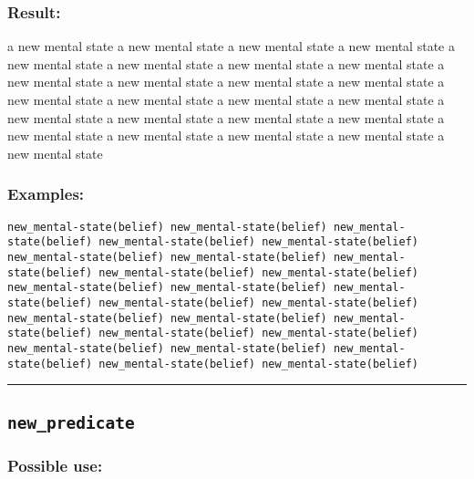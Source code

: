 \documentclass[]{book}
\theoremstyle{definition}
\theoremstyle{definition}
\theoremstyle{definition}
\theoremstyle{remark}
\begin{document}
\subsubsection{Result:}\label{result-358}

a new mental state a new mental state a new mental state a new mental
state a new mental state a new mental state a new mental state a new
mental state a new mental state a new mental state a new mental state a
new mental state a new mental state a new mental state a new mental
state a new mental state a new mental state a new mental state a new
mental state a new mental state a new mental state a new mental state a
new mental state a new mental state a new mental state

\subsubsection{Examples:}\label{examples-257}

\begin{verbatim}
new_mental-state(belief) new_mental-state(belief) new_mental-state(belief) new_mental-state(belief) new_mental-state(belief) new_mental-state(belief) new_mental-state(belief) new_mental-state(belief) new_mental-state(belief) new_mental-state(belief) new_mental-state(belief) new_mental-state(belief) new_mental-state(belief) new_mental-state(belief) new_mental-state(belief) new_mental-state(belief) new_mental-state(belief) new_mental-state(belief) new_mental-state(belief) new_mental-state(belief) new_mental-state(belief) new_mental-state(belief) new_mental-state(belief) new_mental-state(belief) new_mental-state(belief) 
\end{verbatim}

\begin{center}\rule{0.5\linewidth}{\linethickness}\end{center}

\subsection{\texorpdfstring{\texttt{new\_predicate}}{new\_predicate}}\label{new_predicate}

\subsubsection{Possible use:}\label{possible-use-371}
\end{document}
